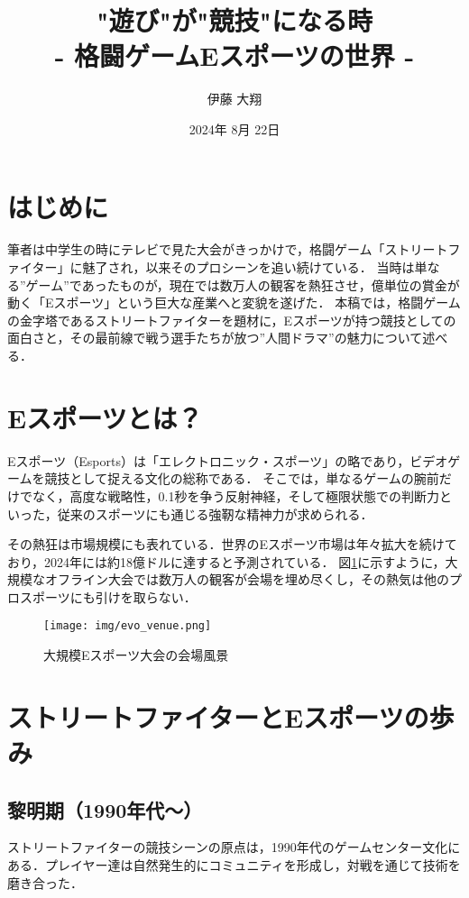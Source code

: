 \documentclass[twocolumn, a4paper]{Zemiresume}
\title{"遊び"が"競技"になる時 \\ - 格闘ゲームEスポーツの世界 -}
\date{2024年 8月 22日}
\author{伊藤 大翔}
\begin{document}
\maketitle

\section{はじめに}
筆者は中学生の時にテレビで見た大会がきっかけで，格闘ゲーム「ストリートファイター」に魅了され，以来そのプロシーンを追い続けている．
当時は単なる”ゲーム”であったものが，現在では数万人の観客を熱狂させ，億単位の賞金が動く「Eスポーツ」という巨大な産業へと変貌を遂げた．
本稿では，格闘ゲームの金字塔であるストリートファイターを題材に，Eスポーツが持つ競技としての面白さと，その最前線で戦う選手たちが放つ”人間ドラマ”の魅力について述べる．

\section{Eスポーツとは？}
Eスポーツ（Esports）は「エレクトロニック・スポーツ」の略であり，ビデオゲームを競技として捉える文化の総称である．
そこでは，単なるゲームの腕前だけでなく，高度な戦略性，0.1秒を争う反射神経，そして極限状態での判断力といった，従来のスポーツにも通じる強靭な精神力が求められる．

その熱狂は市場規模にも表れている．世界のEスポーツ市場は年々拡大を続けており，2024年には約18億ドルに達すると予測されている\cite{cite:newzoo2024}．
図\ref{fig:evo_venue}に示すように，大規模なオフライン大会では数万人の観客が会場を埋め尽くし，その熱気は他のプロスポーツにも引けを取らない．

\begin{figure}[t]
  \centering
  \texttt{[image: img/evo\_venue.png]}
  \caption{大規模Eスポーツ大会の会場風景}\label{fig:evo_venue}
\end{figure}

\section{ストリートファイターとEスポーツの歩み}
\subsection{黎明期（1990年代〜）}
ストリートファイターの競技シーンの原点は，1990年代のゲームセンター文化にある．プレイヤー達は自然発生的にコミュニティを形成し，対戦を通じて技術を磨き合った．
\end{document}
